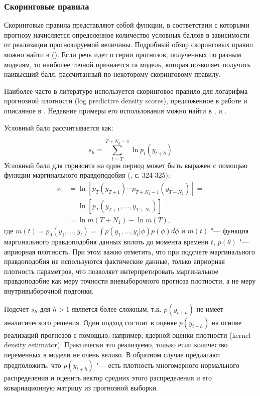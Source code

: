 \documentclass[11pt]{article} %
\begin{document}
\subsubsection{Скоринговые правила}

Скоринговые правила представляют собой функции, в соответствии с которыми прогнозу начисляется определенное количество условных баллов в зависимости от реализации прогнозируемой величины. Подробный обзор скоринговых правил можно найти в (\cite{tsyplakov_2012}). Если речь идет о серии прогнозов, полученных по разным моделям, то наиболее точной признается та модель, которая позволяет получить наивысший балл, рассчитанный по некоторому скоринговому правилу.

Наиболее часто в литературе используется скоринговое правило для логарифма прогнозной плотности (log predictive density scores), предложенное в работе \cite{good_1952} и описанное в \cite{geweke_amisano_2010}. Недавние примеры его использования можно найти в \cite{adolfson_al_2007}, \cite{christoffel_al_2010} и \cite{carriero_al_2015}.

Условный балл рассчитывается как:

\begin{equation}
s_h=\sum_{t=T}^{T+N_h-1} \ln p_t(y_{t+h})
\end{equation}
Условный балл для горизонта на один период может быть выражен с помощью функции маргинального правдоподобия (\cite{adolfson_al_2007}, с. 324-325):
\begin{align}
s_1 &=\ln [p_T(y_{T+1})\cdots p_{T+N_1-1}(y_{T+N_1})]= \\
&=\ln[p_T(y_{T+1},\ldots,y_{T+N_1})]=\\
&=\ln m(T+N_1)-\ln m(T),
\end{align}
где $m(t)=p_0(y_1,\ldots,y_t)=\int p(y_1,\ldots,y_t|\phi) p(\phi) d\phi$ и $m(t)$ "--- функция маргинального правдоподобия данных вплоть до момента времени $t$, $p(\theta)$ "--- априорная плотность. При этом важно отметить, что при подсчете маргинального правдоподобия не используются фактические данные, только априорная плотность параметров, что позволяет интерпретировать маргинальное правдоподобие как меру точности вневыборочного прогноза плотности, а не меру внутривыборочной подгонки.

Подсчет $s_h$ для $h>1$ является более сложным, т.к. $p(y_{t+h})$ не имеет аналитического решения. Один подход состоит в оценке $p(y_{t+h})$ на основе реализаций прогнозов с помощью, например, ядерной оценки плотности (kernel density estimator). Практически это реализуемо, только если количество переменных в модели не очень велико. В обратном случае  \cite{adolfson_al_2007} предлагают предположить, что $p(y_{t+h})$ "--- есть плотность многомерного нормального распределения и оценить вектор средних этого распределения и его ковариационную матрицу из прогнозной выборки.
\end{document}
